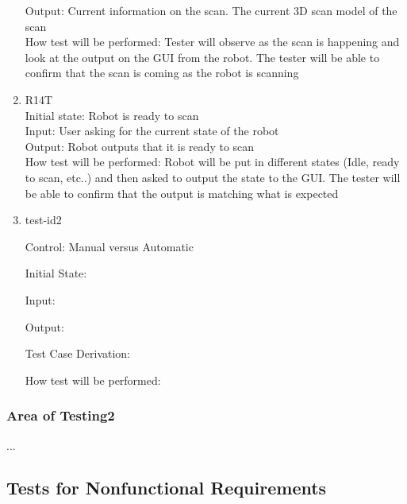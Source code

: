 \documentclass[12pt, titlepage]{article}
\begin{document}
\begin{enumerate}
Output: Current information on the scan. The current 3D scan model of the scan\\
How test will be performed: Tester will observe as the scan is happening and look at the output on the GUI from the robot. The tester will be able to confirm that the scan is coming as the robot is scanning\\
\item{R14T\\}
Initial state: Robot is ready to scan\\
Input: User asking for the current state of the robot\\
Output: Robot outputs that it is ready to scan\\
How test will be performed: Robot will be put in different states (Idle, ready to scan, etc..) and then asked to output the state to the GUI. The tester will be able to confirm that the output is matching what is expected \\











\item{test-id2\\}

Control: Manual versus Automatic
					
Initial State: 
					
Input: 
					
Output: 

Test Case Derivation: 

How test will be performed: 

\end{enumerate}

\subsubsection{Area of Testing2}

...

\subsection{Tests for Nonfunctional Requirements}

\end{document}
